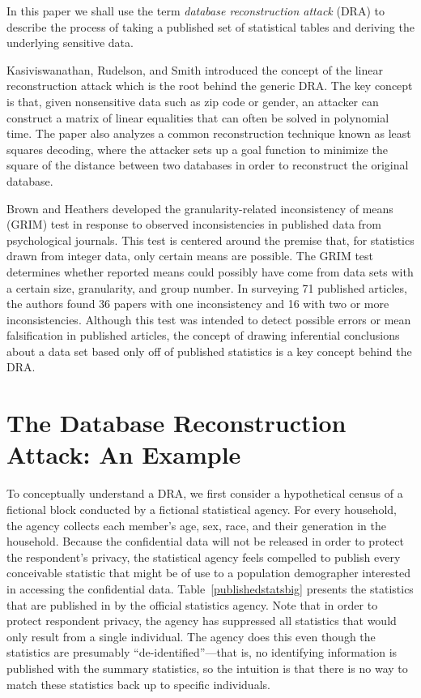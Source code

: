 \documentclass[runningheads]{llncs}
\begin{document}
In this paper we shall use
the term \emph{database reconstruction attack} (DRA) to describe the process of
taking a published set of statistical tables and deriving the
underlying sensitive data. 

Kasiviswanathan, Rudelson, and Smith\cite{Kasiviswanathan:2013:PLR:2627817.2627919} introduced
the concept of the linear reconstruction attack which is the root
behind the generic DRA. The key concept is that,
given nonsensitive data such as zip code or gender, an attacker
can construct a matrix of linear equalities that can often be solved
in polynomial time. The paper also analyzes a common reconstruction
technique known as least squares decoding, where the attacker sets up
a goal function to minimize the square of the distance between two
databases in order to reconstruct the original database. 

Brown and Heathers\cite{doi:10.1177/1948550616673876} developed the
granularity-related inconsistency of means (GRIM) test in response to
observed inconsistencies in published data from psychological
journals. This test is centered around the premise that, for
statistics drawn from integer data, only certain means are
possible. The GRIM test determines whether reported means could
possibly have come from data sets with a certain size, granularity,
and group number. In surveying 71 published articles, the authors
found 36 papers with one inconsistency and 16 with two or more
inconsistencies. Although this test was intended to detect possible
errors or mean falsification in published articles, the concept of
drawing inferential conclusions about a data set based only off of
published statistics is a key concept behind the DRA.

\section{The Database Reconstruction Attack: An Example}

To conceptually understand a DRA, we first consider a hypothetical
census of a fictional block conducted by a fictional statistical
agency. For every household, the agency collects each member's age,
sex, race, and their generation in the household.  Because the
confidential data will not be released in order to protect the
respondent's privacy, the statistical agency feels compelled to
publish every conceivable statistic that might be of use to a
population demographer interested in accessing the confidential
data. Table~\ref{publishedstatsbig} presents the statistics that are
published in by the official statistics agency. Note that in order to
protect respondent privacy, the agency has suppressed all statistics
that would only result from a single individual. The agency does this
even though the statistics are presumably ``de-identified''---that is,
no identifying information is published with the summary statistics,
so the intuition is that there is no way to match these statistics
back up to specific individuals.
\end{document}
